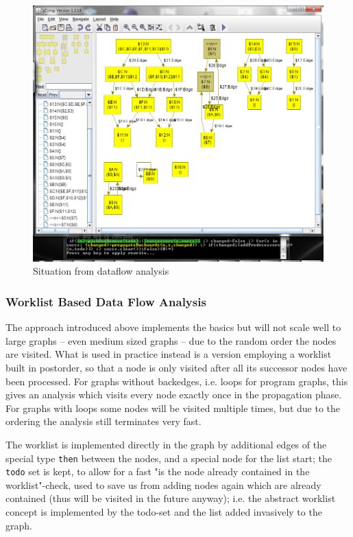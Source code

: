 \begin{figure}[htbp]
  \centering
  \includegraphics[width=\textwidth]{fig/Dataflow}
  \caption{Situation from dataflow analysis}
  \label{figdataflow}
\end{figure}

\subsubsection*{Worklist Based Data Flow Analysis}

The approach introduced above implements the basics but will not scale well to large graphs -- even medium sized graphs -- due to the random order the nodes are visited.
What is used in practice instead is a version employing a worklist built in postorder, so that a node is only visited after all its successor nodes have been processed.
For graphs without backedges, i.e. loops for program graphs, this gives an analysis which visits every node exactly once in the propagation phase.
For graphs with loops some nodes will be visited multiple times, but due to the ordering the analysis still terminates very fast.

The worklist is implemented directly in the graph by additional edges of the special type \verb#then# between the nodes, and a special node for the list start; the \verb#todo# set is kept, to allow for a fast "is the node already contained in the worklist"-check, used to save us from adding nodes again which are already contained (thus will be visited in the future anyway); i.e. the abstract worklist concept is implemented by the todo-set and the list added invasively to the graph.

